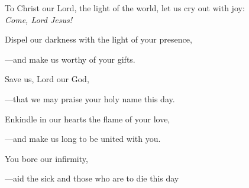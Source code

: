 \intercessions\indent

\begin{hangpar}

To Christ our Lord, the light of the world, let us cry out with joy:\\
\emph{Come, Lord Jesus!}

\medskip Dispel our darkness with the light of your presence,

{\color{red}---\thinspace}and make us worthy of your gifts.

\medskip Save us, Lord our God,

{\color{red}---\thinspace}that we may praise your holy name this day.

\medskip Enkindle in our hearts the flame of your love,

{\color{red}---\thinspace}and make us long to be united with you.

\medskip You bore our infirmity,

{\color{red}---\thinspace}aid the sick and those who are to die this day 

\medskip

\end{hangpar}